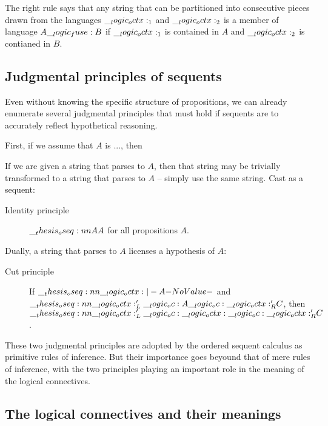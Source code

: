 The right rule says that any string that can be partitioned into consecutive pieces drawn from the languages $\__logic_octx:_1$ and $\__logic_octx:_2$ is a member of language $A \__logic_fuse: B$ if $\__logic_octx:_1$ is contained in $A$ and $\__logic_octx:_2$ is contianed in $B$.

\subsection{Judgmental principles of sequents}

Even without knowing the specific structure of propositions, we can already enumerate several judgmental principles that must hold if sequents are to accurately reflect hypothetical reasoning.

First, if we assume that $A$ is ..., then 

If we are given a string that parses to $A$, then that string may be trivially transformed to a string that parses to $A$ -- simply use the same string.
Cast as a sequent:
\begin{description}
\item[Identity principle]
  $\oseq{A |- A}$ for all propositions $A$.
\end{description}

Dually, a string that parses to $A$ licenses a hypothesis of $A$:
\begin{description}
\item[Cut principle]
  If $\oseq{\octx |- A}$ and $\oseq{\octx'_L \oc A \oc \octx'_R |- C}$, then $\oseq{\octx'_L \oc \octx \oc \octx'_R |- C}$.
\end{description}

These two judgmental principles are adopted by the ordered sequent calculus as primitive rules of inference.
But their importance goes beyound that of mere rules of inference, with the two principles playing an important role in the meaning of the logical connectives.

\subsection{The logical connectives and their meanings}

